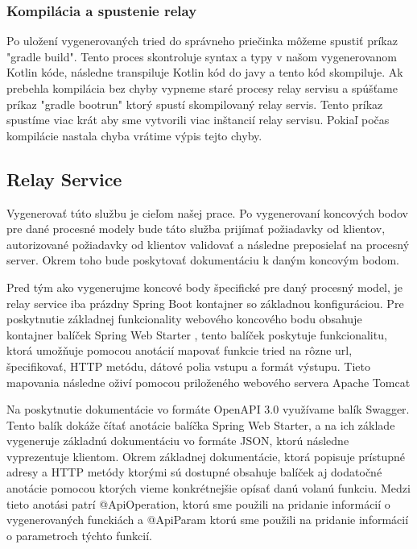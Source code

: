 \subsubsection{Kompilácia a spustenie relay} 

Po uložení vygenerovaných tried do správneho priečinka môžeme spustiť príkaz "gradle build". Tento proces skontroluje syntax a typy v našom vygenerovanom Kotlin kóde, následne transpiluje Kotlin kód do javy a tento kód skompiluje. Ak prebehla kompilácia bez chyby vypneme staré procesy relay servisu a spúšťame príkaz "gradle bootrun" ktorý spustí skompilovaný relay servis. Tento príkaz spustíme viac krát aby sme vytvorili viac inštancií relay servisu. Pokiaľ počas kompilácie nastala chyba vrátime výpis tejto chyby.  



\subsection{Relay Service} 

Vygenerovať túto službu je cieľom našej prace. Po vygenerovaní koncových bodov pre dané procesné modely bude táto služba prijímať požiadavky od klientov, autorizované požiadavky od klientov validovať a následne preposielať na procesný server. Okrem toho bude poskytovať dokumentáciu k daným koncovým bodom. 

Pred tým ako vygenerujme koncové body špecifické pre daný procesný model, je relay service iba prázdny Spring Boot kontajner so základnou konfiguráciou. Pre poskytnutie základnej funkcionality webového koncového bodu obsahuje kontajner balíček Spring Web Starter \cite{webstarter}, tento balíček poskytuje funkcionalitu, ktorá umožňuje pomocou anotácií mapovať funkcie tried na rôzne \acrshort{url}, špecifikovať, HTTP metódu, dátové polia vstupu a formát výstupu. Tieto mapovania následne oživí pomocou priloženého webového servera Apache Tomcat \cite{tomcat} 

Na poskytnutie dokumentácie vo formáte OpenAPI 3.0 \cite{openapi} využívame balík Swagger. Tento balík dokáže čítať anotácie balíčka Spring Web Starter, a na ich základe vygeneruje základnú dokumentáciu vo formáte JSON, ktorú následne vyprezentuje klientom. Okrem základnej dokumentácie, ktorá popisuje prístupné adresy a HTTP metódy ktorými sú dostupné obsahuje balíček aj dodatočné anotácie pomocou ktorých vieme konkrétnejšie opísať danú volanú funkciu. Medzi tieto anotási patrí @ApiOperation, ktorú sme použili na pridanie informácií o vygenerovaných funckiách a @ApiParam ktorú sme použili na pridanie informácií o parametroch týchto funkcií. 

